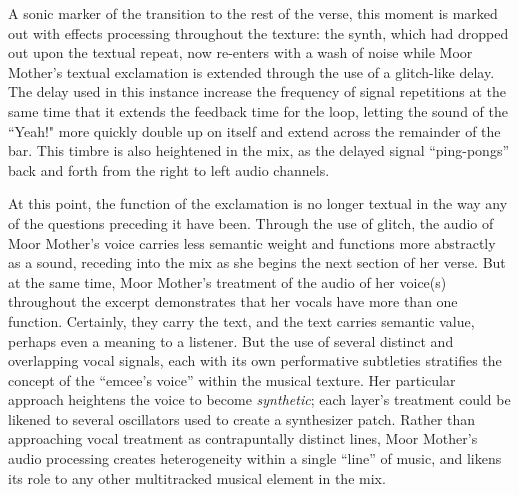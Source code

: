 \clearpage
A sonic marker of the transition to the rest of the verse, this moment is marked out with effects processing throughout
the texture: the synth, which had dropped out upon the textual repeat, now re-enters with a wash of noise while Moor
Mother's textual exclamation is extended through the use of a glitch-like delay. The delay used in this instance
increase the frequency of signal repetitions at the same time that it extends the feedback time for the loop, letting
the sound of the ``Yeah!" more quickly double up on itself and extend across the remainder of the bar. This timbre is
also heightened in the mix, as the delayed signal ``ping-pongs'' back and forth from the right to left audio channels.

At this point, the function of the exclamation is no longer textual in the way any of the questions preceding it have
been. Through the use of glitch, the audio of Moor Mother's voice carries less semantic weight and functions more 
abstractly as a sound, receding into the mix as she begins the next section of her verse. But at the same time, Moor 
Mother's treatment of the audio of her voice(s) throughout the excerpt demonstrates that her vocals have more than 
one function. Certainly, they carry the text, and the text carries semantic value, perhaps even a meaning to a listener.
But the use of several distinct and overlapping vocal signals, each with its own performative subtleties stratifies
the concept of the ``emcee's voice'' within the musical texture. Her particular approach heightens the voice to
become \emph{synthetic}; each layer's treatment could be likened to several oscillators used to create a synthesizer
patch. Rather than approaching vocal treatment as contrapuntally distinct lines, Moor Mother's audio processing
creates heterogeneity within a single ``line'' of music, and likens its role to any other multitracked musical 
element in the mix.
